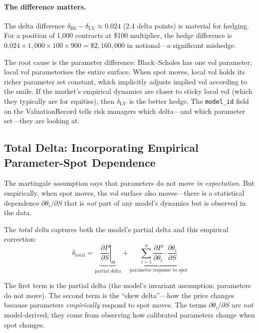 \documentclass[11pt,a4paper]{article}
\begin{document}
\paragraph{The difference matters.}  The delta difference $\delta_{\mathrm{BS}} - \delta_{\mathrm{LV}} \approx 0.024$ (2.4 delta points) is material for hedging.  For a position of 1{,}000 contracts at \$100 multiplier, the hedge difference is $0.024 \times 1{,}000 \times 100 \times 900 = \$2{,}160{,}000$ in notional---a significant mishedge.

The root cause is the parameter difference: Black--Scholes has one vol parameter; local vol parameterises the entire surface.  When spot moves, local vol holds its richer parameter set constant, which implicitly adjusts implied vol according to the smile.  If the market's empirical dynamics are closer to sticky local vol (which they typically are for equities), then $\delta_{\mathrm{LV}}$ is the better hedge.  The \texttt{model\_id} field on the ValuationRecord tells risk managers which delta---and which parameter set---they are looking at.

\subsection{Total Delta: Incorporating Empirical Parameter-Spot Dependence}
\label{sec:total-delta}

The martingale assumption says that parameters do not move \emph{in expectation}.  But empirically, when spot moves, the vol surface also moves---there is a statistical dependence $\partial \theta_i / \partial S$ that is \emph{not} part of any model's dynamics but is observed in the data.

The \emph{total delta} captures both the model's partial delta and this empirical correction:
\begin{equation}\label{eq:total_delta}
\boxed{\delta_{\text{total}} = \underbrace{\left.\frac{\partial P}{\partial S}\right|_{\Theta}}_{\text{partial delta}} + \underbrace{\sum_{i=1}^{n} \frac{\partial P}{\partial \theta_i} \cdot \frac{\partial \theta_i}{\partial S}}_{\text{parameter response to spot}}}
\end{equation}

The first term is the partial delta (the model's invariant assumption: parameters do not move).  The second term is the ``skew delta''---how the price changes because parameters \emph{empirically} respond to spot moves.  The terms $\partial \theta_i / \partial S$ are \emph{not} model-derived; they come from observing how calibrated parameters change when spot changes.
\end{document}
